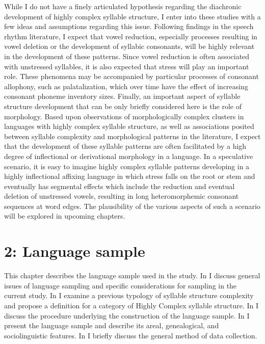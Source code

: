   While I do not have a finely articulated hypothesis regarding the diachronic development of highly complex syllable structure, I enter into these studies with a few ideas and assumptions regarding this issue. Following findings in the speech rhythm literature, I expect that vowel reduction, especially processes resulting in vowel deletion or the development of syllabic consonants, will be highly relevant in the development of these patterns. Since vowel reduction is often associated with unstressed syllables, it is also expected that stress will play an important role. These phenomena may be accompanied by particular processes of consonant allophony, such as palatalization, which over time have the effect of increasing consonant phoneme inventory sizes. Finally, an important aspect of syllable structure development that can be only briefly considered here is the role of morphology. Based upon observations of morphologically complex clusters in languages with highly complex syllable structure, as well as associations posited between syllable complexity and morphological patterns in the literature, I expect that the development of these syllable patterns are often facilitated by a high degree of inflectional or derivational morphology in a language. In a speculative scenario, it is easy to imagine highly complex syllable patterns developing in a highly inflectional affixing language in which stress falls on the root or stem and eventually has segmental effects which include the reduction and eventual deletion of unstressed vowels, resulting in long heteromorphemic consonant sequences at word edges. The plausibility of the various aspects of such a scenario will be explored in upcoming chapters.

\chapter{2: Language sample}

  This chapter describes the language sample used in the study. In  I discuss general issues of language sampling and specific considerations for sampling in the current study. In  I examine a previous typology of syllable structure complexity and propose a definition for a category of Highly Complex syllable structure. In  I discuss the procedure underlying the construction of the language sample. In  I present the language sample and describe its areal, genealogical, and sociolinguistic features. In  I briefly discuss the general method of data collection.

